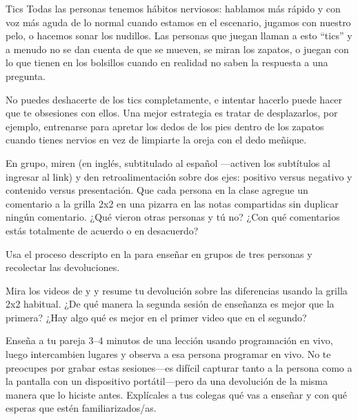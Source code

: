 \begin{aside}{Tics}
  Todas las personas tenemos hábitos nerviosos:
  hablamos más rápido y con voz más aguda de lo normal cuando estamos en el escenario,
  jugamos con nuestro pelo,
  o hacemos sonar los nudillos.
  Las personas que juegan llaman a esto ``tics''
  y a menudo no se dan cuenta de que se mueven,
  se miran los zapatos,
  o juegan con lo que tienen en los bolsillos
  cuando en realidad no saben la respuesta a una pregunta.

  No puedes deshacerte de los tics completamente,
  e intentar hacerlo puede hacer que te obsesiones con ellos.
  Una mejor estrategia es tratar de desplazarlos, por ejemplo,
  entrenarse para apretar los dedos de los pies dentro de los zapatos cuando tienes nervios
  en vez de limpiarte la oreja con el dedo meñique.
\end{aside}



En grupo,
miren  
(en inglés, subtitulado al español ---activen los subtítulos al ingresar al link)
y den retroalimentación sobre dos ejes:
positivo versus negativo y contenido versus presentación.
Que cada persona en la clase agregue un comentario a la grilla 2x2 en una pizarra en las notas compartidas
sin duplicar ningún comentario.
¿Qué vieron otras personas y tú no?
¿Con qué comentarios estás totalmente de acuerdo o en desacuerdo?


Usa el proceso descripto en la 
para enseñar en grupos de tres personas y recolectar las devoluciones.


Mira los videos de 
y 
y resume tu devolución sobre las diferencias usando la grilla 2x2 habitual.
¿De qué manera la segunda sesión de enseñanza es mejor que la primera?
¿Hay algo qué es mejor en el primer video que en el segundo?


Enseña a tu pareja 3--4 minutos de una lección usando programación en vivo,
luego intercambien lugares y observa a esa persona programar en vivo.
No te preocupes por grabar estas sesiones---es difícil capturar tanto a la persona como a la pantalla con un dispositivo portátil---pero
da una devolución de la misma manera que lo hiciste antes.
Explícales a tus colegas qué vas a enseñar y con qué esperas que estén familiarizados/as.


